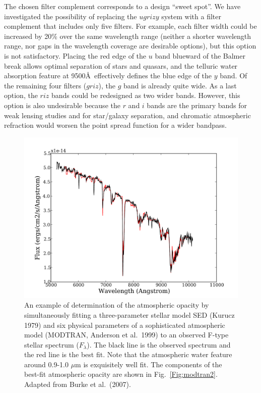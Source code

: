 \documentclass{emulateapj}
\begin{document}
The chosen filter complement corresponds to a design ``sweet spot''. We have 
investigated the possibility of replacing the $ugrizy$ system with a
filter complement that includes only five filters. For example, each filter
width could be increased by 20\% over the same wavelength range (neither a
shorter wavelength range, nor gaps in the wavelength coverage are desirable 
options), but this option is not satisfactory. Placing the red edge of the $u$ 
band blueward of the Balmer break allows optimal separation of stars and
quasars, and the telluric water absorption feature at 9500\AA\
effectively defines the blue edge of the $y$ band. Of the remaining four
filters ($griz$), the $g$ band is already quite wide. As a last option, the 
$riz$ bands could be redesigned as two wider bands. However, this option is also 
undesirable because the $r$ and $i$ bands are the primary bands for weak
lensing studies and for star/galaxy separation, and chromatic atmospheric
refraction would worsen the point spread function for a wider bandpass. 


\begin{figure}
\hskip -0.12in
\includegraphics[width=1.1\hsize,clip]{modtran1.pdf}
\caption{An example of determination of the atmospheric opacity by 
simultaneously fitting a three-parameter stellar model SED (Kurucz 1979) and 
six physical parameters of a sophisticated atmospheric model (MODTRAN, Anderson 
et al.~1999) to an observed F-type stellar spectrum ($F_\lambda$). The black 
line is the observed spectrum and the red line is the best fit. Note that the 
atmospheric water feature around 0.9-1.0 $\mu$m is exquisitely well fit. 
The components of the best-fit atmospheric opacity are shown in 
Fig.~\ref{Fig:modtran2}. Adapted from Burke et al.~(2007).}
\label{Fig:modtran1}
\end{figure}
\end{document}
